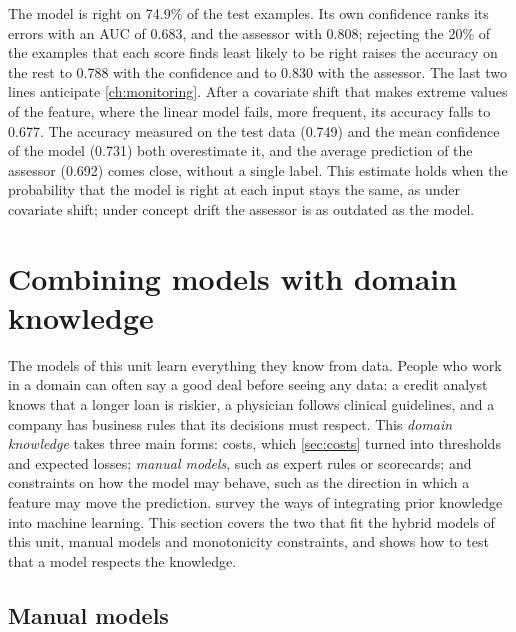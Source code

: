 The model is right on 74.9\% of the test examples. Its own confidence ranks its errors with an
AUC of 0.683, and the assessor with 0.808; rejecting the 20\% of the
examples that each score finds least likely to be right raises the accuracy on the rest to 0.788
with the confidence and to 0.830 with the assessor. The last two lines anticipate
\cref{ch:monitoring}. After a covariate shift that makes extreme values of the
feature, where the linear model fails, more frequent, its accuracy falls to 0.677. The accuracy
measured on the test data (0.749) and the mean confidence of the model (0.731) both overestimate
it, and the average prediction of the assessor (0.692) comes close, without a single label. This
estimate holds when the probability that the model is right at each input stays the same, as
under covariate shift; under concept drift the assessor is as outdated as the model.

\section{Combining models with domain knowledge}\label{sec:knowledge}

The models of this unit learn everything they know from data. People who work in a domain can
often say a good deal before seeing any data: a credit analyst knows that a longer loan is
riskier, a physician follows clinical guidelines, and a company has business rules that its
decisions must respect. This \emph{domain knowledge} takes three main forms: costs,
which \cref{sec:costs} turned into thresholds and expected losses; \emph{manual models}, such as
expert rules or scorecards; and constraints on how the model may behave, such as the direction
in which a feature may move the prediction.  survey the ways of
integrating prior knowledge into machine learning. This section covers the two that fit the
hybrid models of this unit, manual models and monotonicity constraints, and shows how to test
that a model respects the knowledge.

\subsection{Manual models}

